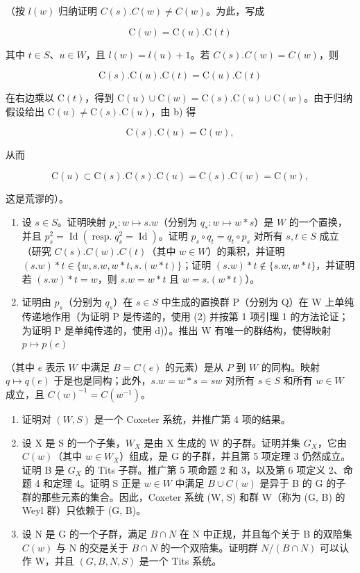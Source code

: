 （按 \(l(w)\) 归纳证明 \(C(s).C(w) \neq C(w)\)。为此，写成

\[
\mathrm{C} (w) = \mathrm{C} (u). \mathrm{C} (t)
\]

其中 \(t \in S\)、\(u \in W\)，且 \(l(w) = l(u) + 1\)。若 \(C(s).C(w) = C(w)\)，则

\[
\mathrm{C} (s). \mathrm{C} (u). \mathrm{C} (t) = \mathrm{C} (u). \mathrm{C} (t)
\]

在右边乘以 \(\mathrm{C}(t)\)，得到 \(\mathrm{C}(u) \cup \mathrm{C}(w) = \mathrm{C}(s).\mathrm{C}(u) \cup \mathrm{C}(w)\)。由于归纳假设给出 \(\mathrm{C}(u) \neq \mathrm{C}(s).\mathrm{C}(u)\)，由 b) 得

\[
\mathrm{C} (s). \mathrm{C} (u) = \mathrm{C} (w),
\]

从而

\[
\mathrm{C} (u) \subset \mathrm{C} (s). \mathrm{C} (s). \mathrm{C} (u) = \mathrm{C} (s). \mathrm{C} (w) = \mathrm{C} (w),
\]

这是荒谬的）。

\begin{enumerate}
\def\labelenumi{\alph{enumi})}
\setcounter{enumi}{3}
\item
  设 \(s \in S\)。证明映射 \(p_s: w \mapsto s.w\)（分别为 \(q_s: w \mapsto w * s\)）是 \(W\) 的一个置换，并且 \(p_s^2 = \operatorname{Id}(\operatorname{resp.} q_s^2 = \operatorname{Id})\)。证明 \(p_s \circ q_t = q_t \circ p_s\) 对所有 \(s, t \in S\) 成立（研究 \(C(s).C(w).C(t)\)（其中 \(w \in W\)）的乘积，并证明 \((s.w) * t \in \{w, s.w, w * t, s.(w * t)\}\)；证明 \((s.w) * t \notin \{s.w, w * t\}\)，并证明若 \((s.w) * t = w\)，则 \(s.w = w * t\) 且 \(w = s.(w * t)\)）。
\item
  证明由 \(p_{s}\)（分别为 \(q_{s}\)）在 \(s \in S\) 中生成的置换群 P（分别为 Q）在 W 上单纯传递地作用（为证明 P 是传递的，使用 (2) 并按第 1 项引理 1 的方法论证；为证明 P 是单纯传递的，使用 d)）。推出 W 有唯一的群结构，使得映射 \(p \mapsto p(e)\)
\end{enumerate}

 （其中 \(e\) 表示 \(W\) 中满足 \(B = C(e)\) 的元素）是从 \(P\) 到 \(W\) 的同构。映射 \(q \mapsto q(e)\) 于是也是同构；此外，\(s.w = w * s = sw\) 对所有 \(s \in S\) 和所有 \(w \in W\) 成立，且 \(C(w)^{-1} = C(w^{-1})\)。

\begin{enumerate}
\def\labelenumi{\alph{enumi})}
\setcounter{enumi}{5}
\item
  证明对 \((W,S)\) 是一个 Coxeter 系统，并推广第 4 项的结果。
\item
  设 X 是 S 的一个子集，\(W_{X}\) 是由 X 生成的 W 的子群。证明并集 \(G_{X}\)，它由 \(C(w)\)（其中 \(w \in W_{X}\)）组成，是 G 的子群，并且第 5 项定理 3 仍然成立。证明 B 是 \(G_{X}\) 的 Tits 子群。推广第 5 项命题 2 和 3，以及第 6 项定义 2、命题 4 和定理 4。证明 S 正是 \(w \in W\) 中满足 \(B \cup C(w)\) 是异于 B 的 G 的子群的那些元素的集合。因此，Coxeter 系统 (W, S) 和群 W（称为 (G, B) 的 Weyl 群）只依赖于 (G, B)。
\item
  设 N 是 G 的一个子群，满足 \(B \cap N\) 在 N 中正规，并且每个关于 B 的双陪集 \(C(w)\) 与 N 的交是关于 \(B \cap N\) 的一个双陪集。证明群 \(N/(B \cap N)\) 可以认作 W，并且 \((G, B, N, S)\) 是一个 Tits 系统。
\end{enumerate}

